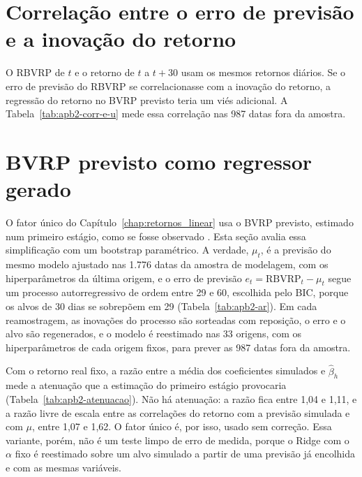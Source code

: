 

\section{Correlação entre o erro de previsão e a inovação do retorno}
\label{sec:apb2-corr-e-u}

O RBVRP de $t$ e o retorno de $t$ a $t+30$ usam os mesmos retornos diários.
Se o erro de previsão do RBVRP se correlacionasse com a inovação do retorno, a
regressão do retorno no BVRP previsto teria um viés adicional. A
Tabela~\ref{tab:apb2-corr-e-u} mede essa correlação nas 987 datas fora da
amostra.



\section{BVRP previsto como regressor gerado}
\label{sec:apb2-regressor-gerado}

O fator único do Capítulo~\ref{chap:retornos_linear} usa o BVRP previsto,
estimado num primeiro estágio, como se fosse observado \citep{pagan1984}.
Esta seção avalia essa simplificação com um bootstrap paramétrico. A verdade,
$\mu_t$, é a previsão do mesmo modelo ajustado nas 1.776 datas da amostra de
modelagem, com os hiperparâmetros da última origem, e o erro de previsão
$e_t = \text{RBVRP}_t - \mu_t$ segue um processo autorregressivo de ordem
entre 29 e 60, escolhida pelo BIC, porque os alvos de 30 dias se sobrepõem em
29 (Tabela~\ref{tab:apb2-ar}). Em cada reamostragem, as inovações do processo
são sorteadas com reposição, o erro e o alvo são regenerados, e o modelo é
reestimado nas 33 origens, com os hiperparâmetros de cada origem fixos, para
prever as 987 datas fora da amostra.



Com o retorno real fixo, a razão entre a média dos coeficientes simulados e
$\hat\beta_h$ mede a atenuação que a estimação do primeiro estágio provocaria
(Tabela~\ref{tab:apb2-atenuacao}). Não há atenuação: a razão fica entre 1,04
e 1,11, e a razão livre de escala entre as correlações do retorno com a
previsão simulada e com $\mu$, entre 1,07 e 1,62. O fator único é, por isso,
usado sem correção. Essa variante, porém, não é um teste limpo de erro de
medida, porque o Ridge com o $\alpha$ fixo é reestimado sobre um alvo simulado
a partir de uma previsão já encolhida e com as mesmas variáveis.

